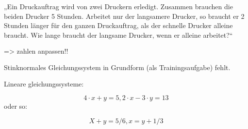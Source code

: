  

„Ein Druckauftrag wird von zwei Druckern erledigt. Zusammen brauchen die beiden Drucker 5 Stunden. Arbeitet nur der langsamere Drucker, so braucht er 2 Stunden länger für den ganzen Druckauftrag, als der schnelle Drucker alleine braucht. Wie lange braucht der langsame Drucker, wenn er alleine arbeitet?“ 

=> zahlen anpassen!!



Stinknormales Gleichungssystem in Grundform (als Trainingsaufgabe)
fehlt.

Lineare gleichungssysteme: 

$$4\cdot{}x+y=5, 2\cdot{}x-3\cdot{}y=13$$
oder so:

$$X+y=5/6, x=y+1/3 $$



